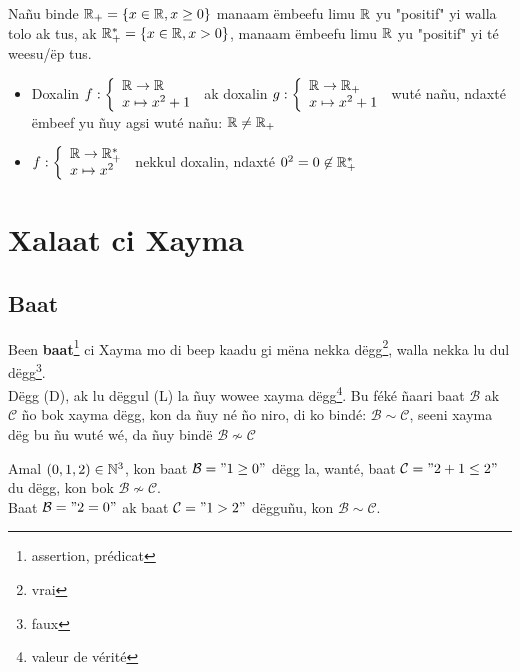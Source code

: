 \documentclass[twoside, a4paper]{article}
\begin{document}
Nañu binde $\mathbb{R}_{+} = \{x \in \mathbb{R}, x \geq 0 \}$ manaam ëmbeefu limu $\mathbb{R}$ yu "positif" yi walla tolo ak tus, ak $\mathbb{R}_{+}^{*} = \{x \in \mathbb{R}, x > 0 \}$, manaam ëmbeefu limu $\mathbb{R}$ yu "positif" yi té weesu/ëp tus.

\begin{itemize}
  \item Doxalin $f: \left\{
          \begin{array}{ll}
            \mathbb{R} \rightarrow{} \mathbb{R} \\
            x \mapsto x^2+1
          \end{array}
          \right.$ ak doxalin $g: \left\{
          \begin{array}{ll}
            \mathbb{R} \rightarrow{} \mathbb{R}_{+} \\
            x \mapsto x^2+1
          \end{array}
          \right.$ wuté nañu, ndaxté ëmbeef yu ñuy agsi wuté nañu: $\mathbb{R} \neq \mathbb{R}_{+}$

  \item $f: \left\{
          \begin{array}{ll}
            \mathbb{R} \rightarrow{} \mathbb{R}_{+}^{*} \\
            x \mapsto x^2
          \end{array}
          \right.$ nekkul doxalin, ndaxté $0^2=0\not\in \mathbb{R}_{+}^{*}$
\end{itemize}


\section{Xalaat ci Xayma}

\subsection{Baat}
\begin{tcolorbox}[enhanced jigsaw,breakable,pad at break*=1mm, colback=red!5!white,colframe=white!75!black,title= Téeki,
    watermark color=white]
  Been \textbf{baat}\footnote{assertion, prédicat} ci Xayma mo di beep kaadu gi mëna nekka dëgg\footnote{vrai}, walla nekka lu dul dëgg\footnote{faux}.\\
  Dëgg (D), ak lu dëggul (L) la ñuy wowee xayma dëgg\footnote{valeur de vérité}. Bu féké ñaari baat $\mathcal{B}$ ak $\mathcal{C}$ ño bok xayma dëgg, kon da ñuy né ño niro, di ko bindé: $\mathcal{B}\sim \mathcal{C}$, seeni xayma dëg bu ñu wuté wé, da ñuy bindë $\mathcal{B}\not\sim \mathcal{C}$
\end{tcolorbox}
Amal  $(0,1,2)\in \mathbb{N}^3$, kon baat $\mathcal{B} = "1 \geq 0"$ dëgg la, wanté, baat $\mathcal{C} = "2 + 1 \leq 2"$ du dëgg, kon bok $\mathcal{B}\not\sim \mathcal{C}$.\\
Baat $\mathcal{B}="2=0"$ ak baat $\mathcal{C}="1>2"$ dëgguñu, kon $\mathcal{B}\sim \mathcal{C}$.
\end{document}
